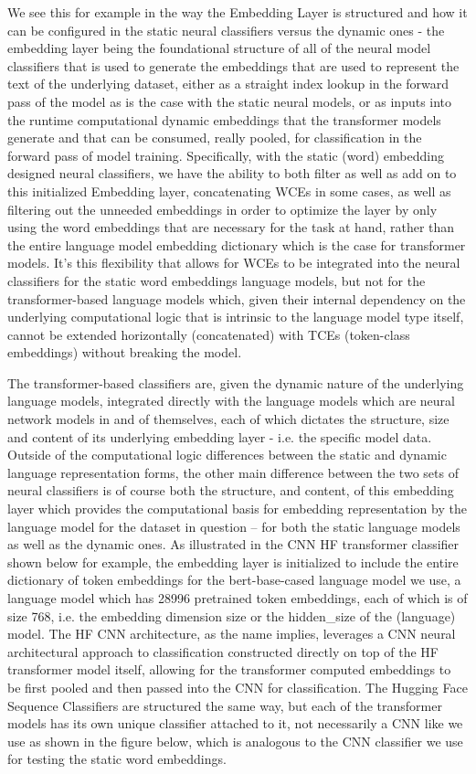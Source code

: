 \documentclass[final]{clv2025}
\begin{document}
We see this for example in the way the Embedding Layer is structured and how it can be configured in the static neural classifiers versus the dynamic ones - the embedding layer being the foundational structure of all of the neural model classifiers that is used to generate the embeddings that are used to represent the text of the underlying dataset, either as a straight index lookup in the forward pass of the model as is the case with the static neural models, or as inputs into the runtime computational dynamic embeddings that the transformer models generate and that can be consumed, really pooled, for classification in the forward pass of model training. Specifically, with the static (word) embedding designed neural classifiers, we have the ability to both filter as well as add on to this initialized Embedding layer, concatenating WCEs in some cases, as well as filtering out the unneeded embeddings in order to optimize the layer by only using the word embeddings that are necessary for the task at hand, rather than the entire language model embedding dictionary which is the case for transformer models. It's this flexibility that allows for WCEs to be integrated into the neural classifiers for the static word embeddings language models, but not for the transformer-based language models which, given their internal dependency on the underlying computational logic that is intrinsic to the language model type itself, cannot be extended horizontally (concatenated) with TCEs (token-class embeddings) without breaking the model.

The transformer-based classifiers are, given the dynamic nature of the underlying language models, integrated directly with the language models which are neural network models in and of themselves, each of which dictates the structure, size and content of its underlying embedding layer - i.e. the specific model data. Outside of the computational logic differences between the static and dynamic language representation forms, the other main difference between the two sets of neural classifiers is of course both the structure, and content, of this embedding layer which provides the computational basis for embedding representation by the language model for the dataset in question – for both the static language models as well as the dynamic ones. As illustrated in the CNN HF transformer classifier shown below for example, the embedding layer is initialized to include the entire dictionary of token embeddings for the bert-base-cased language model we use, a language model which has 28996 pretrained token embeddings, each of which is of size 768, i.e. the embedding dimension size or the hidden\_size of the (language) model. The HF CNN architecture, as the name implies, leverages a CNN neural architectural approach to classification constructed directly on top of the HF transformer model itself, allowing for the transformer computed embeddings to be first pooled and then passed into the CNN for classification. The Hugging Face Sequence Classifiers are structured the same way, but each of the transformer models has its own unique classifier attached to it, not necessarily a CNN like we use as shown in the figure below, which is analogous to the CNN classifier we use for testing the static word embeddings. 
\end{document}
